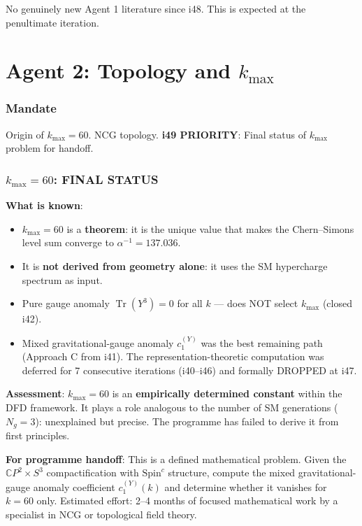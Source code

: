 \documentclass[11pt,a4paper]{article}
\newcommand{\Tr}{\operatorname{Tr}}
\newcommand{\CP}{\mathbb{C}P}
\begin{document}
No genuinely new Agent 1 literature since i48. This is expected at the penultimate iteration.


\part{Agent 2: Topology and $k_{\max}$}
\label{part:agent2}

\section{Mandate}

Origin of $k_{\max} = 60$. NCG topology. \textbf{i49 PRIORITY}: Final status of $k_{\max}$ problem for handoff.

\section{$k_{\max} = 60$: FINAL STATUS}

\begin{tcolorbox}[colback=yellow!5!white, colframe=yellow!60!black,
  title={$k_{\max} = 60$: Final Status --- OPEN Problem}]

\textbf{What is known}:
\begin{itemize}
\item $k_{\max} = 60$ is a \textbf{theorem}: it is the unique value that makes the Chern--Simons level sum converge to $\alpha^{-1} = 137.036$.
\item It is \textbf{not derived from geometry alone}: it uses the SM hypercharge spectrum as input.
\item Pure gauge anomaly $\Tr(Y^3) = 0$ for all $k$ --- does NOT select $k_{\max}$ (closed i42).
\item Mixed gravitational-gauge anomaly $c_1^{(Y)}$ was the best remaining path (Approach C from i41). The representation-theoretic computation was deferred for 7 consecutive iterations (i40--i46) and formally DROPPED at i47.
\end{itemize}

\textbf{Assessment}: $k_{\max} = 60$ is an \textbf{empirically determined constant} within the DFD framework. It plays a role analogous to the number of SM generations ($N_g = 3$): unexplained but precise. The programme has failed to derive it from first principles.

\textbf{For programme handoff}: This is a defined mathematical problem. Given the $\CP^2 \times S^3$ compactification with $\text{Spin}^c$ structure, compute the mixed gravitational-gauge anomaly coefficient $c_1^{(Y)}(k)$ and determine whether it vanishes for $k = 60$ only. Estimated effort: 2--4 months of focused mathematical work by a specialist in NCG or topological field theory.
\end{tcolorbox}
\end{document}
